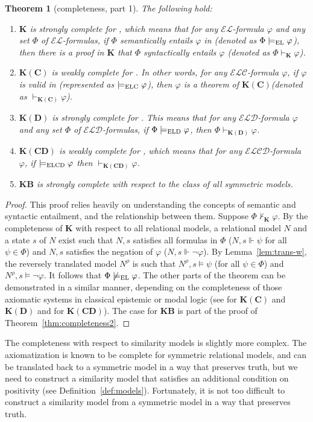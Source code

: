\documentclass{article}
\newtheorem{theorem}{Theorem}
\renewcommand{\phi}{\varphi}
\newcommand{\lang}{\ensuremath{\mathcal{EL}}\xspace}
\newcommand{\langc}{\ensuremath{\mathcal{ELC}}\xspace}
\newcommand{\langd}{\ensuremath{\mathcal{ELD}}\xspace}
\newcommand{\langcd}{\ensuremath{\mathcal{ELCD}}\xspace}
\renewcommand{\l}{\text{\normalfont EL}\xspace}
\newcommand{\lc}{\text{\normalfont ELC}\xspace}
\newcommand{\ld}{\text{\normalfont ELD}\xspace}
\newcommand{\lcd}{\text{\normalfont ELCD}\xspace}
\newcommand{\K}{\ensuremath{\mathbf{K}}\xspace}
\newcommand{\KC}{\ensuremath{\mathbf{K(C)}}\xspace}
\newcommand{\KD}{\ensuremath{\mathbf{K(D)}}\xspace}
\newcommand{\KCD}{\ensuremath{\mathbf{K(CD)}}\xspace}
\newcommand{\KB}{\ensuremath{\mathbf{KB}}\xspace}
\begin{document}
\begin{theorem}[completeness, part 1]\label{thm:completeness1}
The following hold:
\begin{enumerate}
\item \K is strongly complete for \l, which means that for any \lang-formula $\phi$ and any set $\Phi$ of \lang-formulas, if $\Phi$ semantically entails $\phi$ in \l (denoted as $\Phi \models_\l \phi$), then there is a proof in \K that $\Phi$ syntactically entails $\phi$ (denoted as $\Phi \vdash_{\K} \phi$).
\item \KC is weakly complete for \lc. In other words, for any \langc-formula $\phi$, if $\phi$ is valid in \lc (represented as $\models_\lc \phi$), then $\phi$ is a theorem of \KC (denoted as $\vdash_{\KC} \phi$).
\item \KD is strongly complete for \ld. This means that for any \langd-formula $\phi$ and any set $\Phi$ of \langd-formulas, if $\Phi \models_\ld \phi$, then $\Phi \vdash_{\KD} \phi$.
\item \KCD is weakly complete for \lcd, which means that for any \langcd-formula $\phi$, if $\models_\lcd \phi$ then $\vdash_{\KCD} \phi$.
\item \KB is strongly complete with respect to the class of all symmetric models.
\end{enumerate}
\end{theorem}
\begin{proof}
This proof relies heavily on understanding the concepts of semantic and syntactic entailment, and the relationship between them.
Suppose $\Phi \nvdash_{\K} \phi$. By the completeness of \K with respect to all relational models, a relational model $N$ and a state $s$ of $N$ exist such that $N,s$ satisfies all formulas in $\Phi$ ($N,s \Vdash \psi$ for all $\psi \in \Phi$) and $N,s$ satisfies the negation of $\phi$ ($N,s \Vdash \neg\phi$). By Lemma~\ref{lem:trans-w}, the reversely translated model $N^\rho$ is such that  $N^\rho,s \models \psi$ (for all $\psi \in \Phi$) and $N^\rho,s\models \neg\phi$. It follows that $\Phi \not\models_\l \phi$.
%
The other parts of the theorem can be demonstrated in a similar manner, depending on the completeness of those axiomatic systems in classical epistemic or modal logic (see \cite[Ch.~3]{FHMV1995} for \KC and \KD and \cite{WA2020} for \KCD). The case for \KB is part of the proof of Theorem~\ref{thm:completeness2}.
\end{proof}

The completeness with respect to similarity models is slightly more complex. The axiomatization is known to be complete for symmetric relational models, and can be translated back to a symmetric model in a way that preserves truth, but we need to construct a similarity model that satisfies an additional condition on positivity (see Definition~\ref{def:models}). Fortunately, it is not too difficult to construct a similarity model from a symmetric model in a way that preserves truth.
\end{document}
